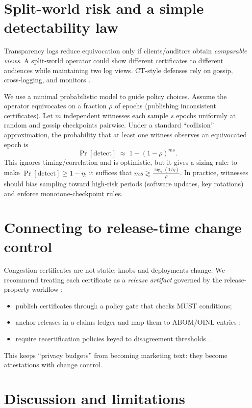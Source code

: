 \documentclass[11pt]{article}
\begin{document}
\section{Split-world risk and a simple detectability law}
Transparency logs reduce equivocation only if clients/auditors obtain \emph{comparable views}.
A split-world operator could show different certificates to different audiences while maintaining two log views.
CT-style defenses rely on gossip, cross-logging, and monitors \cite{rfc9162}.

We use a minimal probabilistic model to guide policy choices.
Assume the operator equivocates on a fraction $\rho$ of epochs (publishing inconsistent certificates).
Let $m$ independent witnesses each sample $s$ epochs uniformly at random and gossip checkpoints pairwise.
Under a standard ``collision'' approximation, the probability that at least one witness observes an equivocated epoch is
\begin{equation}
\Pr[\text{detect}] \;\approx\; 1 - (1-\rho)^{ms}.
\end{equation}
This ignores timing/correlation and is optimistic, but it gives a sizing rule: to make $\Pr[\text{detect}]\ge 1-\eta$, it suffices that $ms \gtrsim \frac{\log_2(1/\eta)}{\rho}$.
In practice, witnesses should bias sampling toward high-risk periods (software updates, key rotations) and enforce monotone-checkpoint rules.

\section{Connecting to release-time change control}
Congestion certificates are not static: knobs and deployments change.
We recommend treating each certificate as a \emph{release artifact} governed by the release-property workflow \cite{series:release}:
\begin{itemize}[leftmargin=1.2em]
\item publish certificates through a policy gate that checks MUST conditions;
\item anchor releases in a claims ledger and map them to ABOM/OINL entries \cite{series:abom};
\item require recertification policies keyed to disagreement thresholds \cite{series:recert}.
\end{itemize}
This keeps ``privacy budgets'' from becoming marketing text: they become attestations with change control.

\section{Discussion and limitations}
\end{document}
